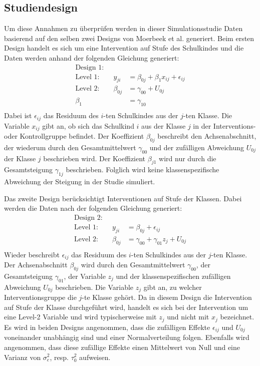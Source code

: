 \documentclass[12pt]{article}\usepackage[]{graphicx}\usepackage[]{color}
\begin{document}
\subsection{Studiendesign}
Um diese Annahmen zu überprüfen werden in dieser Simulationsstudie Daten basierend auf den selben zwei Designs von Moerbeek et al. \citeyearpar{MOERBEEK2003341} generiert. Beim ersten Design handelt es sich um eine Intervention auf Stufe des Schulkindes und die Daten werden anhand der folgenden Gleichung generiert:
\begin{equation} 
\begin{split}
\text{Design 1:}\\	
 \text{Level 1:}  \qquad y_{ji} & = \beta_{0j} + \beta_{1}x_{ij} + \epsilon_{ij}\\
 \text{Level 2:} \qquad \beta_{0j} & = \gamma_{00} + U_{0j}\\
 \beta_{1} & = \gamma_{10}\\
 \end{split}	
\end{equation} 
Dabei ist $\epsilon_{ij}$ das Residuum des $i$-ten Schulkindes aus der $j$-ten Klasse. Die Variable $x_{ij}$ gibt an, ob sich das Schulkind $i$ aus der Klasse $j$ in der Interventions- oder Kontrollgruppe befindet. Der Koeffizient $\beta_{0j}$ beschreibt den Achsenabschnitt, der wiederum durch den Gesamtmittelwert $\gamma_{00}$ und der zufälligen Abweichung $U_{0j}$ der Klasse $j$ beschrieben wird. Der Koeffizient $\beta_{j1}$ wird nur durch die Gesamtsteigung $\gamma_{1j}$ beschrieben. Folglich wird keine klassenspezifische Abweichung der Steigung in der Studie simuliert.

Das zweite Design berücksichtigt Interventionen auf Stufe der Klassen. Dabei werden die Daten nach der folgenden Gleichung generiert:
\begin{equation} 
\begin{split}
 \text{Design 2:}\\
  \text{Level 1:}  \qquad y_{ji} & = \beta_{0j} + \epsilon_{ij}\\
 \text{Level 2:} \qquad \beta_{0j} & = \gamma_{00} + \gamma_{01}z_{j} + U_{0j}\\
\end{split}	
\end{equation} 
Wieder beschreibt $\epsilon_{ij}$ das Residuum des $i$-ten Schulkindes aus der $j$-ten Klasse. Der Achsenabschnitt $\beta_{0j}$ wird durch den Gesamtmittelwert $\gamma_{00}$, der Gesamtsteigung $\gamma_{01}$, der Variable $z_{j}$ und der klassenspezifischen zufälligen Abweichung $U_{0j}$ beschrieben. Die Variable $z_{j}$ gibt an, zu welcher Interventionsgruppe die $j$-te Klasse gehört. Da in diesem Design die Intervention auf Stufe der Klasse durchgeführt wird, handelt es sich bei der Intervention um eine Level-2 Variable und wird typischerweise mit $z_{j}$ und nicht mit $x_{j}$ bezeichnet. Es wird in beiden Designs angenommen, dass die zufälligen Effekte $\epsilon_{ij}$ und $U_{0j}$ voneinander unabhängig sind und einer Normalverteilung folgen. Ebenfalls wird angenommen, dass diese zufällige Effekte einen Mittelwert von Null und eine Varianz von $\sigma^{2}_{e}$, resp. $\tau^{2}_{0}$ aufweisen.
\end{document}
